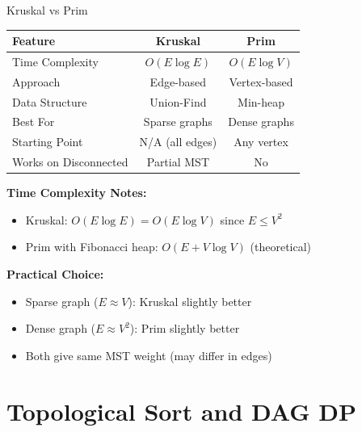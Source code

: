 \documentclass[aspectratio=169]{beamer}
\begin{document}
\begin{frame}{Kruskal vs Prim}
  \begin{center}
  \begin{tabular}{|l|c|c|}
    \hline
    \textbf{Feature} & \textbf{Kruskal} & \textbf{Prim} \\
    \hline
    Time Complexity & $O(E \log E)$ & $O(E \log V)$ \\
    \hline
    Approach & Edge-based & Vertex-based \\
    \hline
    Data Structure & Union-Find & Min-heap \\
    \hline
    Best For & Sparse graphs & Dense graphs \\
    \hline
    Starting Point & N/A (all edges) & Any vertex \\
    \hline
    Works on Disconnected & Partial MST & No \\
    \hline
  \end{tabular}
  \end{center}

  \vspace{0.3cm}
  \textbf{Time Complexity Notes:}
  \begin{itemize}
    \item Kruskal: $O(E \log E) = O(E \log V)$ since $E \leq V^2$
    \item Prim with Fibonacci heap: $O(E + V \log V)$ (theoretical)
  \end{itemize}

  \vspace{0.3cm}
  \textbf{Practical Choice:}
  \begin{itemize}
    \item Sparse graph ($E \approx V$): Kruskal slightly better
    \item Dense graph ($E \approx V^2$): Prim slightly better
    \item Both give same MST weight (may differ in edges)
  \end{itemize}
\end{frame}

\section{Topological Sort and DAG DP}
\end{document}
